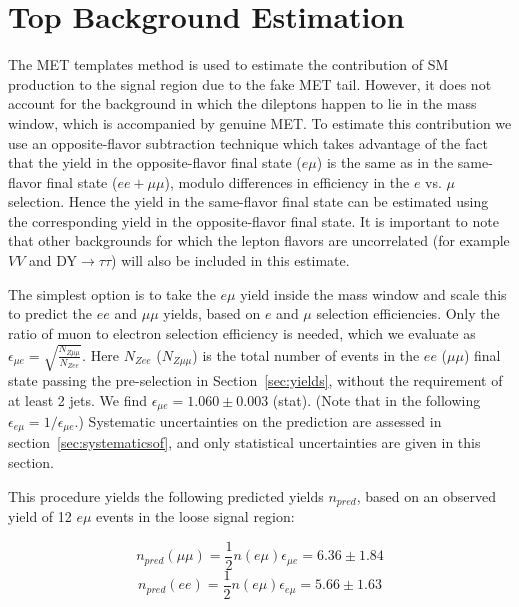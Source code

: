 


\section{Top Background Estimation}
\label{sec:topbkg}


The MET templates method is used to estimate the contribution of SM \Z production
 to the signal region due to the fake MET tail. However,
it does not account for the \ttbar background in which the dileptons happen to lie
 in the \Z mass window, which is accompanied by genuine MET. 
To estimate this contribution we use an opposite-flavor subtraction
technique which takes advantage of the fact that the \ttbar yield in the 
opposite-flavor final state ($e\mu$) is the same as in the same-flavor final state
($ee+\mu\mu$), modulo differences in efficiency in the $e$ vs. $\mu$ selection.
 Hence the \ttbar yield in the same-flavor final state can be estimated
using the corresponding yield in the opposite-flavor final state. 
It is important to note that other backgrounds for which the lepton flavors are
uncorrelated (for example $VV$ and DY$\rightarrow \tau\tau$) will also be included in
this estimate.

The simplest option
 is to take the $e\mu$ yield inside the \Z mass window and scale this
to predict the $ee$ and $\mu\mu$ yields, based on $e$ and $\mu$ selection efficiencies.
Only the ratio of muon to electron selection efficiency is needed, which we evaluate
 as $\epsilon_{\mu e} = \sqrt{\frac{N_{Z\mu\mu}}{N_{Zee}}}$. 
Here $N_{Zee}$ ($N_{Z\mu\mu}$) is the total number of events in the $ee$ ($\mu\mu$)
 final state passing the pre-selection in Section~\ref{sec:yields},
without the requirement of at least 2 jets. We find
 $\epsilon_{\mu e}=1.060 \pm 0.003$ (stat). %
(Note that in the following $\epsilon_{e\mu} = 1/\epsilon_{\mu e}$.)
Systematic uncertainties on the prediction are assessed in section~\ref{sec:systematicsof}, 
and only statistical uncertainties are given in this section.

This procedure yields the following predicted yields $n_{pred}$,
based on an observed yield of 12 $e\mu$ events %
in the loose signal region: 

\begin{equation}
n_{pred}(\mu\mu) = \frac{1}{2}n(e\mu)\epsilon_{\mu e} = 6.36 \pm 1.84 %
\end{equation}
\begin{equation}
n_{pred}(ee)     = \frac{1}{2}n(e\mu)\epsilon_{e\mu} = 5.66 \pm 1.63
\end{equation}

